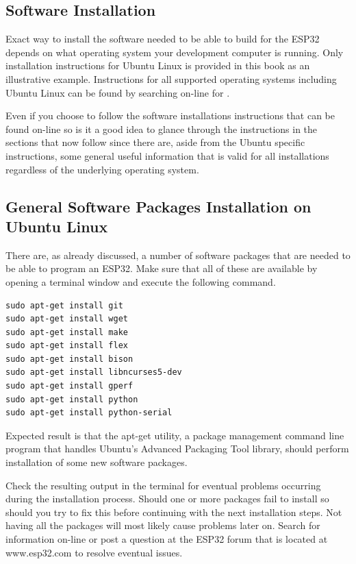 \documentclass{tufte-book}
\begin{document}
\subsection{Software Installation}
Exact way to install the software needed to be able to build for the ESP32 depends on what operating system your development computer is running.
Only installation instructions for Ubuntu Linux is provided in this book as an illustrative example. Instructions for all supported operating systems including Ubuntu Linux can be found by searching on-line for .

Even if you choose to follow the software installations instructions that can be found on-line so is it a good idea to glance through the instructions in the sections that now follow since there are, aside from the Ubuntu specific instructions, some general useful information that is valid for all installations regardless of the underlying operating system.

\subsection{General Software Packages Installation on Ubuntu Linux}
There are, as already discussed, a number of software packages that are needed to be able to program an ESP32. Make sure that all of these are available by opening a terminal window and execute the following command.
	
\begin{lstlisting}
sudo apt-get install git
sudo apt-get install wget
sudo apt-get install make
sudo apt-get install flex
sudo apt-get install bison
sudo apt-get install libncurses5-dev
sudo apt-get install gperf
sudo apt-get install python
sudo apt-get install python-serial
\end{lstlisting}

Expected result is that the apt-get utility, a package management command line program that handles Ubuntu's Advanced Packaging Tool library, should perform installation of some new software packages.
 
Check the resulting output in the terminal for eventual problems occurring during the installation process. Should one or more packages fail to install so should you try to fix this before continuing with the next installation steps. Not having all the packages will most likely cause problems later on. Search for information on-line or post a question at the ESP32 forum that is located at www.esp32.com to resolve eventual issues.
\end{document}
